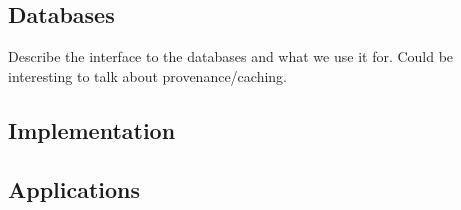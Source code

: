 \subsection*{Databases}
Describe the interface to the databases and what we use it for. Could be
interesting to talk about provenance/caching.

\subsection*{Implementation}

\subsection*{Applications}





